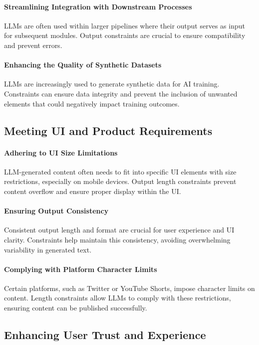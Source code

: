 \paragraph{Streamlining Integration with Downstream Processes}
LLMs are often used within larger pipelines where their output serves as input for subsequent modules. Output constraints are crucial to ensure compatibility and prevent errors.

\paragraph{Enhancing the Quality of Synthetic Datasets}
LLMs are increasingly used to generate synthetic data for AI training. Constraints can ensure data integrity and prevent the inclusion of unwanted elements that could negatively impact training outcomes.

\subsection{Meeting UI and Product Requirements}

\paragraph{Adhering to UI Size Limitations}
LLM-generated content often needs to fit into specific UI elements with size restrictions, especially on mobile devices. Output length constraints prevent content overflow and ensure proper display within the UI.

\paragraph{Ensuring Output Consistency}
Consistent output length and format are crucial for user experience and UI clarity. Constraints help maintain this consistency, avoiding overwhelming variability in generated text.

\paragraph{Complying with Platform Character Limits}
Certain platforms, such as Twitter or YouTube Shorts, impose character limits on content. Length constraints allow LLMs to comply with these restrictions, ensuring content can be published successfully.

\subsection{Enhancing User Trust and Experience}

